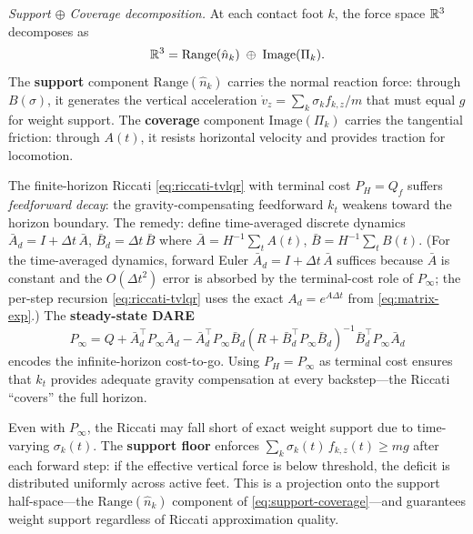 \medskip\noindent\emph{Support $\oplus$ Coverage decomposition.}
At each contact foot $k$, the force space $\mathbb{R}^3$ decomposes as
\begin{equation}\label{eq:support-coverage}
\mathbb{R}^3 = \mathrm{Range}(\hat{n}_k) \;\oplus\; \mathrm{Image}(\Pi_k).
\end{equation}
The \textbf{support} component $\mathrm{Range}(\hat{n}_k)$ carries the
normal reaction force: through $B(\sigma)$, it generates the vertical
acceleration $\dot{v}_z = \sum_k \sigma_k f_{k,z}/m$ that must equal $g$
for weight support.
The \textbf{coverage} component $\mathrm{Image}(\Pi_k)$ carries the
tangential friction: through $A(t)$, it resists horizontal velocity and
provides traction for locomotion.

The finite-horizon Riccati \eqref{eq:riccati-tvlqr} with terminal cost
$P_H = Q_f$ suffers \emph{feedforward decay}: the gravity-compensating
feedforward $k_t$ weakens toward the horizon boundary.
The remedy: define time-averaged discrete dynamics
$\bar{A}_d = I + \Delta t\,\bar{A}$,
$\bar{B}_d = \Delta t\,\bar{B}$
where $\bar{A} = H^{-1}\sum_t A(t)$, $\bar{B} = H^{-1}\sum_t B(t)$.
(For the time-averaged dynamics, forward Euler
$\bar{A}_d = I + \Delta t\,\bar{A}$ suffices because $\bar{A}$ is
constant and the $O(\Delta t^2)$ error is absorbed by the terminal-cost
role of $P_\infty$; the per-step recursion \eqref{eq:riccati-tvlqr}
uses the exact $A_d = e^{A\Delta t}$ from \eqref{eq:matrix-exp}.)
The \textbf{steady-state DARE}
\begin{equation}\label{eq:dare-terminal}
P_\infty = Q + \bar{A}_d^\top P_\infty \bar{A}_d
  - \bar{A}_d^\top P_\infty \bar{B}_d
    (R + \bar{B}_d^\top P_\infty \bar{B}_d)^{-1}
    \bar{B}_d^\top P_\infty \bar{A}_d
\end{equation}
encodes the infinite-horizon cost-to-go.
Using $P_H = P_\infty$ as terminal cost ensures that $k_t$ provides
adequate gravity compensation at every backstep---the Riccati
``covers'' the full horizon.

Even with $P_\infty$, the Riccati may fall short of exact weight support
due to time-varying $\sigma_k(t)$.
The \textbf{support floor} enforces
$\sum_k \sigma_k(t)\,f_{k,z}(t) \geq mg$
after each forward step: if the effective vertical force is below
threshold, the deficit is distributed uniformly across active feet.
This is a projection onto the support half-space---the
$\mathrm{Range}(\hat{n}_k)$ component of
\eqref{eq:support-coverage}---and guarantees weight support regardless
of Riccati approximation quality.

